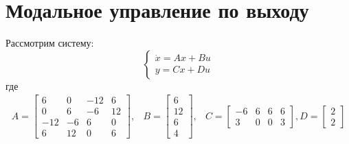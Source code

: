 \section{Модальное управление по выходу}
Рассмотрим систему: 
\begin{equation}
    \begin{cases}
        \dot{x} = Ax + Bu \\
        y = Cx + Du
    \end{cases}
\end{equation} 
где
\begin{equation}
    \begin{array}{cccc}
        A = \begin{bmatrix}
            6 & 0 & -12 & 6 \\ 
            0 & 6 & -6 & 12 \\
            -12 & -6 & 6 & 0 \\
            6 & 12 & 0 & 6
        \end{bmatrix}, & 
        B = \begin{bmatrix}
            6 \\ 12 \\ 6 \\ 4
        \end{bmatrix}, & 
        C = \begin{bmatrix}
            -6 & 6 & 6 & 6 \\
            3 & 0 & 0 & 3
        \end{bmatrix}, 
        D = \begin{bmatrix}
            2 \\ 2
        \end{bmatrix}
    \end{array}
\end{equation}

